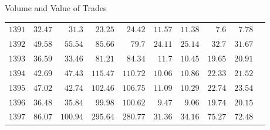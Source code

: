 \documentclass{beamer}
\begin{document}
\begin{frame}{Volume and Value of Trades}
\begin{tabular}{lrrrrrrrrr}
        \(\mathrm{1391}\)           & \(\mathrm{32.47}\)                               & \(\mathrm{31.3}\)                                      & \(\mathrm{23.25}\)                             & \(\mathrm{24.42}\)                          & \(\mathrm{11.57}\)  & \(\mathrm{11.38}\)  & \(\mathrm{7.6}\)     & \(\mathrm{7.78}\)    \\
        \(\mathrm{1392}\)           & \(\mathrm{49.58}\)                               & \(\mathrm{55.54}\)                                     & \(\mathrm{85.66}\)                             & \(\mathrm{79.7}\)                           & \(\mathrm{24.11}\)  & \(\mathrm{25.14}\)  & \(\mathrm{32.7}\)    & \(\mathrm{31.67}\)   \\
        \(\mathrm{1393}\)           & \(\mathrm{36.59}\)                               & \(\mathrm{33.46}\)                                     & \(\mathrm{81.21}\)                             & \(\mathrm{84.34}\)                          & \(\mathrm{11.7}\)   & \(\mathrm{10.45}\)  & \(\mathrm{19.65}\)   & \(\mathrm{20.91}\)   \\
        \(\mathrm{1394}\)           & \(\mathrm{42.69}\)                               & \(\mathrm{47.43}\)                                     & \(\mathrm{115.47}\)                            & \(\mathrm{110.72}\)                         & \(\mathrm{10.06}\)  & \(\mathrm{10.86}\)  & \(\mathrm{22.33}\)   & \(\mathrm{21.52}\)   \\
        \(\mathrm{1395}\)           & \(\mathrm{47.02}\)                               & \(\mathrm{42.74}\)                                     & \(\mathrm{102.46}\)                            & \(\mathrm{106.75}\)                         & \(\mathrm{11.09}\)  & \(\mathrm{10.29}\)  & \(\mathrm{22.74}\)   & \(\mathrm{23.54}\)   \\
        \(\mathrm{1396}\)           & \(\mathrm{36.48}\)                               & \(\mathrm{35.84}\)                                     & \(\mathrm{99.98}\)                             & \(\mathrm{100.62}\)                         & \(\mathrm{9.47}\)   & \(\mathrm{9.06}\)   & \(\mathrm{19.74}\)   & \(\mathrm{20.15}\)   \\
        \(\mathrm{1397}\)           & \(\mathrm{86.07}\)                               & \(\mathrm{100.94}\)                                    & \(\mathrm{295.64}\)                            & \(\mathrm{280.77}\)                         & \(\mathrm{31.36}\)  & \(\mathrm{34.16}\)  & \(\mathrm{75.27}\)   & \(\mathrm{72.48}\)   \\

\end{tabular}
\end{frame}
\end{document}

